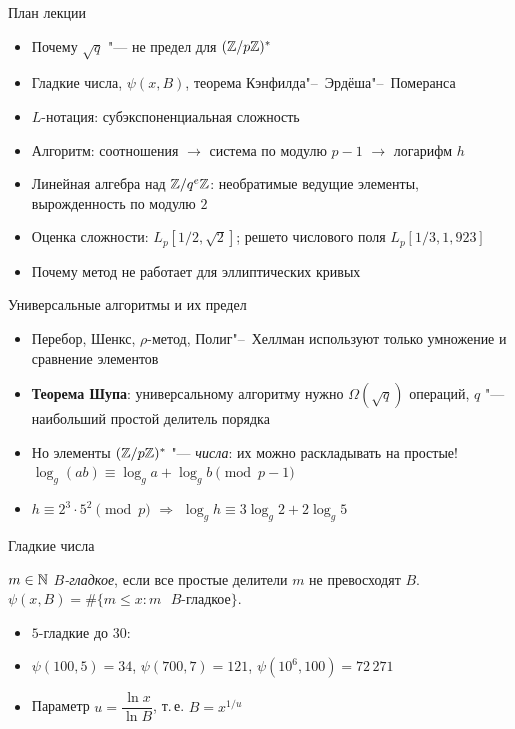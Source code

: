 \documentclass{ca-slides}
\author{}
\begin{document}
\titleframe

\begin{canvasframe}{План лекции}
  \begin{itemize}
    \item Почему $\sqrt q$ "--- не предел для $(\mathbb{Z}/p\mathbb{Z})^{*}$
    \item Гладкие числа, $\psi(x, B)$, теорема Кэнфилда"--~Эрдёша"--~Померанса
    \item $L$-нотация: субэкспоненциальная сложность
    \item Алгоритм: соотношения $\to$ система по модулю $p - 1$ $\to$ логарифм $h$
    \item Линейная алгебра над $\mathbb{Z}/q^e\mathbb{Z}$: необратимые ведущие элементы, вырожденность по
      модулю $2$
    \item Оценка сложности: $L_p[1/2, \sqrt 2]$; решето числового поля $L_p[1/3, 1{,}923]$
    \item Почему метод не работает для эллиптических кривых
  \end{itemize}
\end{canvasframe}

\begin{canvasframe}{Универсальные алгоритмы и их предел}
  \begin{itemize}
    \item Перебор, Шенкс, $\rho$-метод, Полиг"--~Хеллман используют только
      умножение и сравнение элементов
    \item \textbf{Теорема Шупа}: универсальному алгоритму нужно $\Omega(\sqrt q)$ операций,
      $q$ "--- наибольший простой делитель порядка
    \item Но элементы $(\mathbb{Z}/p\mathbb{Z})^{*}$ "--- \emph{числа}: их можно раскладывать на простые!
      \ $\log_g(ab) \equiv \log_g a + \log_g b \pmod{p - 1}$
    \item $h \equiv 2^3 \cdot 5^2 \pmod p$ $\Rightarrow$ $\log_g h \equiv 3\log_g 2 + 2\log_g 5$
  \end{itemize}
\end{canvasframe}

\begin{canvasframe}{Гладкие числа}
  \begin{definition}
    $m \in \mathbb{N}$ \emph{$B$-гладкое}, если все простые делители $m$ не превосходят $B$.
    $\psi(x, B) = \#\{m \le x : m \text{ $B$-гладкое}\}$.
  \end{definition}
  \begin{itemize}
    \item $5$-гладкие до $30$: \penspace[0.06\textheight]
    \item $\psi(100, 5) = 34$, \quad $\psi(700, 7) = 121$, \quad $\psi(10^6, 100) = 72\,271$
    \item Параметр $u = \dfrac{\ln x}{\ln B}$, т.\,е. $B = x^{1/u}$
  \end{itemize}
  \notearea[0.1\textheight]
\end{canvasframe}
\end{document}
